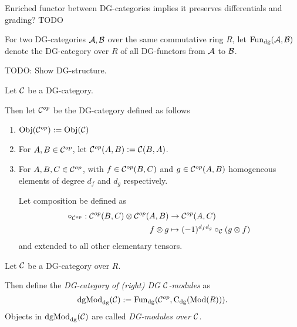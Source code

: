 \begin{remark}
    Enriched functor between DG-categories implies it preserves differentials and grading? TODO
\end{remark}

\begin{notation}
    For two DG-categories \( {\mathcal{A}}, {\mathcal{B}} \) over the same commutative ring \( R \), let \( \operatorname{Fun}_{\operatorname{dg}}({\mathcal{A}}, {\mathcal{B}}) \) denote the DG-category over \( R \) of all DG-functors from \( {\mathcal{A}} \) to \( {\mathcal{B}} \).

    TODO: Show DG-structure.
\end{notation}

\begin{definition}
    Let \( {\mathcal{C}} \) be a DG-category.

    Then let \( {\mathcal{C}}^{op} \) be the DG-category defined as follows
    \begin{enumerate}
        \item {
            \( \operatorname{Obj}({\mathcal{C}}^{op}) := \operatorname{Obj}({\mathcal{C}}) \)
        }
        \item {
            For \( A, B \in {\mathcal{C}}^{op} \), let \( {\mathcal{C}}^{op}(A, B) := {\mathcal{C}}(B, A) \).
        }
        \item {
            For \( A, B, C \in {\mathcal{C}}^{op} \), with \( f \in {\mathcal{C}}^{op}(B, C) \) and \( g \in {\mathcal{C}}^{op}(A, B) \) homogeneous elements of degree \( d_f \) and \( d_g \) respectively.

            Let composition be defined as
            \begin{align*}
                \circ_{{\mathcal{C}}^{op}}: {\mathcal{C}}^{op}(B, C) \otimes {\mathcal{C}}^{op}(A, B) &\to {\mathcal{C}}^{op}(A, C) \\
                f \otimes g &\mapsto (-1)^{d_f d_g} \circ_{{\mathcal{C}}} (g \otimes f)
            \end{align*}
            and extended to all other elementary tensors.
        }
    \end{enumerate}
\end{definition}

\begin{definition}[\( \dgMod_{\dg}(\Cc) \)]
    Let \( {\mathcal{C}} \) be a DG-category over \( R \).

    Then define the \emph{DG-category of (right) DG \( {\mathcal{C}} \)-modules} as
    \[
        \operatorname{dgMod}_{\operatorname{dg}}({\mathcal{C}}) := \operatorname{Fun}_{\operatorname{dg}}({\mathcal{C}}^{op}, \operatorname{C}_{\operatorname{dg}}(\operatorname{Mod}(R))).
    \]
    Objects in \( \dgMod_{\dg}(\Cc) \) are called \emph{DG-modules over \( {\mathcal{C}} \)}.
\end{definition}

